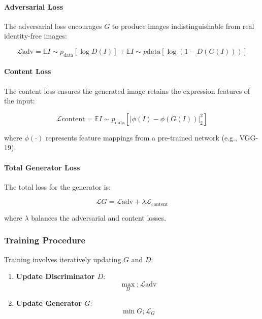 \documentclass[lettersize,journal]{IEEEtran}
\begin{document}
\paragraph{Adversarial Loss}

The adversarial loss encourages $G$ to produce images indistinguishable from real identity-free images:

\begin{equation}
\mathcal{L}{\text{adv}} = \mathbb{E}{I \sim p_{\text{data}}} [\log D(I)] + \mathbb{E}{I \sim p{\text{data}}} [\log(1 - D(G(I)))]
\end{equation}

\paragraph{Content Loss}

The content loss ensures the generated image retains the expression features of the input:

\begin{equation}
\mathcal{L}{\text{content}} = \mathbb{E}{I \sim p_{\text{data}}} \left[ | \phi(I) - \phi(G(I)) |_2^2 \right]
\end{equation}

where $\phi(\cdot)$ represents feature mappings from a pre-trained network (e.g., VGG-19).

\paragraph{Total Generator Loss}

The total loss for the generator is:

\begin{equation}
\mathcal{L}{G} = \mathcal{L}{\text{adv}} + \lambda \mathcal{L}_{\text{content}}
\end{equation}

where $\lambda$ balances the adversarial and content losses.

\subsubsection{Training Procedure}

Training involves iteratively updating $G$ and $D$:

\begin{enumerate}
\item \textbf{Update Discriminator $D$}:
\begin{equation}
\max_{D} ; \mathcal{L}{\text{adv}}
\end{equation}
\item \textbf{Update Generator $G$}:
\begin{equation}
\min{G} ; \mathcal{L}_{G}
\end{equation}
\end{enumerate}
\end{document}
